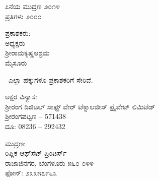 \thispagestyle{empty}
\begin{flushleft}
{\fontsize{10}{12.5}\selectfont
೭ನೆಯ ಮುದ್ರಣ ೨೦೧೪‍\\
ಪ್ರತಿಗಳು ೨೦೦೦
\vfill

ಪ್ರಕಾಶಕರು:\\
ಅಧ್ಯಕ್ಷರು\\
ಶ್ರೀರಾಮಕೃಷ್ಣಆಶ್ರಮ\\
ಮೈಸೂರು
\vfill

\eng{\copyright}\ ಎಲ್ಲಾ ಹಕ್ಕುಗಳೂ ಪ್ರಕಾಶಕರಿಗೆ ಸೇರಿವೆ.
\vfill

ಅಕ್ಷರ ವಿನ್ಯಾಸ:\\ಶ‍್ರೀರಂಗ ಡಿಜಿಟಲ್ ಸಾಫ್ಟ್ ‍ವೇರ್ ಟೆಕ್ನಾಲಜೀಸ್ ಪ್ರೈವೇಟ್ ಲಿಮಿಟೆಡ್\\ಶ‍್ರೀರಂಗಪಟ್ಟಣ – 571438\\ದೂ: 08236 – 292432
\vfill

ಮುದ್ರಣ:\\
ರಿಪ್ಲಿಕ ಆಫ್​ಸೆಟ್ ಪ್ರಿಂಟರ್ಸ್\\
ರಾಜಾಜಿನಗರ, ಬೆಂಗಳೂರು ೫೬೦ ೦೪೪\\
ಫೋನ್: ೨೩೩೫೭೯೬೩
}
\end{flushleft}













